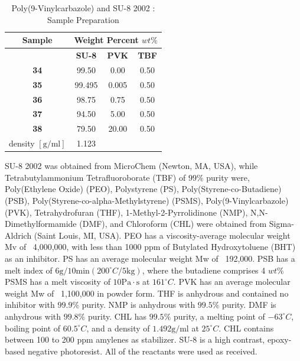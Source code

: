 \begin{table}[!th]
\centering
\caption[Poly(9-Vinylcarbazole) and SU-8 2002 : Sample Preparation]{Poly(9-Vinylcarbazole) and SU-8 2002 : Sample Preparation}
\begin{tabular}{cccc}
\hline
\textbf{Sample} & \multicolumn{3}{c}{\textbf{Weight Percent} $wt\%$} \\
\hline
{}          & \textbf{SU-8} & \textbf{PVK} & \textbf{TBF} \\
\textbf{34} & 99.50         &  0.00        & 0.50         \\
\textbf{35} & 99.495        &  0.005       & 0.50         \\
\textbf{36} & 98.75         &  0.75        & 0.50         \\
\textbf{37} & 94.50         &  5.00        & 0.50         \\
\textbf{38} & 79.50         & 20.00        & 0.50         \\
\hline
density $[\textrm{g} / \textrm{ml}]$
   & 1.123         & {}           & {}           \\
\hline
\end{tabular}
\label{tab:PVKinSU8}
\end{table}

\FloatBarrier %

SU-8 2002 was obtained from MicroChem (Newton, MA, USA), while Tetrabutylammonium Tetrafluoroborate (TBF) of $99\%$ purity were, Poly(Ethylene Oxide) (PEO), Polystyrene (PS), Poly(Styrene-co-Butadiene) (PSB), Poly(Styrene-co-alpha-Methylstyrene) (PSMS), Poly(9-Vinylcarbazole) (PVK), Tetrahydrofuran (THF), 1-Methyl-2-Pyrrolidinone (NMP), N,N-Dimethylformamide (DMF), and Chloroform (CHL) were obtained from Sigma-Aldrich (Saint Louis, MI, USA). PEO has a viscosity-average molecular weight Mv of ~4,000,000, with less than 1000 ppm of Butylated Hydroxytoluene (BHT) as an inhibitor. PS has an average molecular weight Mw of ~192,000. PSB has a melt index of $6 \textrm{g} / 10 \textrm{min} (200^{\circ}C / 5 \textrm{kg})$, where the butadiene comprises 4 $wt\%$ PSMS has a melt viscosity of $10 \textrm{Pa} \cdot \textrm{s}$ at $161^{\circ}C$. PVK has an average molecular weight Mw of ~1,100,000 in powder form. THF is anhydrous and contained no inhibitor with $99.9\%$ purity. NMP is anhydrous with $99.5\%$ purity. DMF is anhydrous with $99.8\%$ purity. CHL has $99.5\%$ purity, a melting point of $-63^{\circ}C$, boiling point of $60.5^{\circ}C$, and a density of $1.492 \textrm{g} / \textrm{ml}$ at $25^{\circ}C$. CHL contains between 100 to 200 ppm amylenes as stabilizer. SU-8 is a high contrast, epoxy-based negative photoresist. All of the reactants were used as received.

